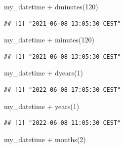 \documentclass[
]{book}
\newenvironment{Shaded}{\begin{snugshade}}{\end{snugshade}}
\newcommand{\DecValTok}[1]{\textcolor[rgb]{0.00,0.00,0.81}{#1}}
\newcommand{\FunctionTok}[1]{\textcolor[rgb]{0.00,0.00,0.00}{#1}}
\newcommand{\NormalTok}[1]{#1}
\newcommand{\SpecialCharTok}[1]{\textcolor[rgb]{0.00,0.00,0.00}{#1}}
\begin{document}
\begin{Shaded}
\begin{Highlighting}[]
\NormalTok{my\_datetime }\SpecialCharTok{+} \FunctionTok{dminutes}\NormalTok{(}\DecValTok{120}\NormalTok{)}
\end{Highlighting}
\end{Shaded}

\begin{verbatim}
## [1] "2021-06-08 13:05:30 CEST"
\end{verbatim}

\begin{Shaded}
\begin{Highlighting}[]
\NormalTok{my\_datetime }\SpecialCharTok{+} \FunctionTok{minutes}\NormalTok{(}\DecValTok{120}\NormalTok{)}
\end{Highlighting}
\end{Shaded}

\begin{verbatim}
## [1] "2021-06-08 13:05:30 CEST"
\end{verbatim}

\begin{Shaded}
\begin{Highlighting}[]
\NormalTok{my\_datetime }\SpecialCharTok{+} \FunctionTok{dyears}\NormalTok{(}\DecValTok{1}\NormalTok{)}
\end{Highlighting}
\end{Shaded}

\begin{verbatim}
## [1] "2022-06-08 17:05:30 CEST"
\end{verbatim}

\begin{Shaded}
\begin{Highlighting}[]
\NormalTok{my\_datetime }\SpecialCharTok{+} \FunctionTok{years}\NormalTok{(}\DecValTok{1}\NormalTok{)}
\end{Highlighting}
\end{Shaded}

\begin{verbatim}
## [1] "2022-06-08 11:05:30 CEST"
\end{verbatim}

\begin{Shaded}
\begin{Highlighting}[]
\NormalTok{my\_datetime }\SpecialCharTok{+} \FunctionTok{months}\NormalTok{(}\DecValTok{2}\NormalTok{)}
\end{Highlighting}
\end{Shaded}
\end{document}

